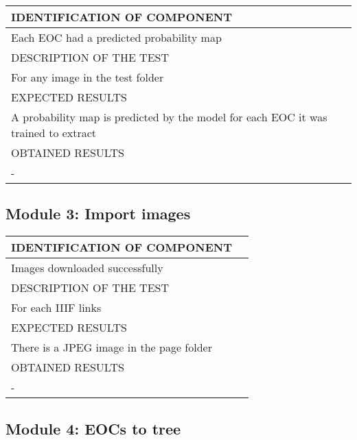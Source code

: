 \documentclass{polytech/polytech}
\numberwithin{figure}{chapter}
\begin{document}
\begin{appendix}
\begin{table}[]
\begin{tabular}{|l|l|}\hline
\color{C} IDENTIFICATION OF COMPONENT \\\hline
Each EOC had a predicted probability map  \\\hline
\color{C} DESCRIPTION OF THE TEST\\\hline
For any image in the test folder   \\\hline
\color{C} EXPECTED RESULTS \\\hline
A probability map is predicted by the model for each EOC it was trained to extract \\\hline
\color{C} OBTAINED RESULTS \\\hline
- \\\hline
\end{tabular}
\end{table}

\subsection{Module 3: Import images}

\begin{table}[]
\begin{tabular}{|l|l|}\hline
\color{C} IDENTIFICATION OF COMPONENT \\\hline
Images downloaded successfully  \\\hline
\color{C} DESCRIPTION OF THE TEST\\\hline
For each IIIF links    \\\hline
\color{C} EXPECTED RESULTS \\\hline
There is a JPEG image in the page folder \\\hline
\color{C} OBTAINED RESULTS \\\hline
- \\\hline
\end{tabular}
\end{table}

\subsection{Module 4: EOCs to tree}


\end{appendix}
\end{document}
